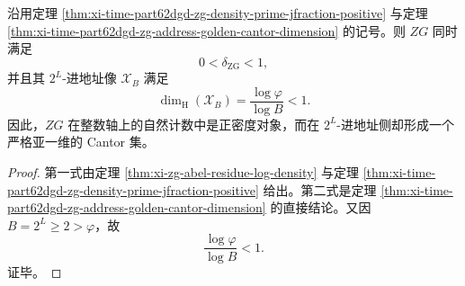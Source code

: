 \begin{corollary}\label{cor:xi-time-part62dgd-zg-archimedean-nonarchimedean-scale-separation}
沿用定理 \ref{thm:xi-time-part62dgd-zg-density-prime-jfraction-positive} 与定理 \ref{thm:xi-time-part62dgd-zg-address-golden-cantor-dimension} 的记号。则 \(ZG\) 同时满足
\[
0<\delta_{\mathrm{ZG}}<1,
\]
并且其 \(2^L\)-进地址像 \(\mathcal X_B\) 满足
\[
\dim_{\mathrm H}(\mathcal X_B)
=
\frac{\log\varphi}{\log B}
<1.
\]
因此，\(ZG\) 在整数轴上的自然计数中是正密度对象，而在 \(2^L\)-进地址侧却形成一个严格亚一维的 Cantor 集。
\end{corollary}
\begin{proof}
第一式由定理 \ref{thm:xi-zg-abel-residue-log-density} 与定理
\ref{thm:xi-time-part62dgd-zg-density-prime-jfraction-positive}
给出。第二式是定理
\ref{thm:xi-time-part62dgd-zg-address-golden-cantor-dimension}
的直接结论。又因 \(B=2^L\ge 2>\varphi\)，故
\[
\frac{\log\varphi}{\log B}<1.
\]
证毕。
\end{proof}

\endinput
